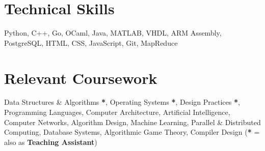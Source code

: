 \documentclass[letterpaper,10pt]{resume}
\newcommand{\resumeItem }[2]{
  \item\small{
    \textbf{#1}{: #2 \vspace{-4.5pt}}
  }
}
\newcommand{\resumeSubItem}[2]{\resumeItem{#1}{#2}\vspace{0pt}}
\newcommand{\resumeSubHeadingListEnd}{\end{itemize}}
\begin{document}
  

\vspace{-0.1cm}
\section{Technical Skills}
 {Python, C++, Go, OCaml, Java, MATLAB, VHDL, ARM Assembly, PostgreSQL, HTML, CSS, JavaScript, Git, MapReduce} %
 \vspace{-0.5cm}

\section{Relevant Coursework}
    {Data Structures \& Algorithms \textbf{*}, Operating Systems \textbf{*}, Design Practices \textbf{*}, Programming Languages, Computer Architecture, Artificial Intelligence, Computer Networks, Algorithm Design, Machine Learning, Parallel \& Distributed Computing, Database Systems, Algorithmic Game Theory, Compiler Design \hfill(\textbf{*} = also as \textbf{Teaching Assistant})}

    
 
\end{document}
